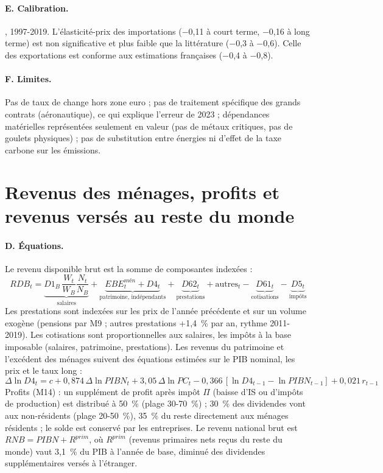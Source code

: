 \paragraph{E. Calibration.} , 1997-2019. L'élasticité-prix des importations ($-$0,11 à court terme, $-$0,16 à
long terme) est non significative et plus faible que la littérature ($-$0,3 à $-$0,6). Celle des exportations est
conforme aux estimations françaises ($-$0,4 à $-$0,8).

\paragraph{F. Limites.} Pas de taux de change hors zone euro ; pas de traitement spécifique des grands contrats
(aéronautique), ce qui explique l'erreur de 2023 ; dépendances matérielles représentées seulement en valeur (pas de
métaux critiques, pas de goulets physiques) ; pas de substitution entre énergies ni d'effet de la taxe carbone sur les
émissions.

\section{Revenus des ménages, profits et revenus versés au reste du monde}
\label{sec:revenus}

\paragraph{D. Équations.} Le revenu disponible brut est la somme de composantes indexées :
\begin{equation}
RDB_t = \underbrace{D1_B\,\frac{W_t}{W_B}\frac{N_t}{N_B}}_{\text{salaires}} + \underbrace{EBE^{mén}_t + D4_t}_{\text{patrimoine, indépendants}}
+ \underbrace{D62_t}_{\text{prestations}} + \text{autres}_t - \underbrace{D61_t}_{\text{cotisations}} - \underbrace{D5_t}_{\text{impôts}}
\end{equation}
Les prestations sont indexées sur les prix de l'année précédente et sur un volume exogène (pensions par M9 ; autres
prestations +1,4~\% par an, rythme 2011-2019). Les cotisations sont proportionnelles aux salaires, les impôts à la base
imposable (salaires, patrimoine, prestations). Les revenus du patrimoine et l'excédent des ménages suivent des équations
estimées sur le PIB nominal, les prix et le taux long :
\begin{equation}
\Delta\ln D4_t = c + 0{,}874\,\Delta\ln PIBN_t + 3{,}05\,\Delta\ln PC_t - 0{,}366\,[\ln D4_{t-1}-\ln PIBN_{t-1}] + 0{,}021\,r_{t-1}
\end{equation}
Profits (M14) : un supplément de profit après impôt $\Pi$ (baisse d'IS ou d'impôts de production) est distribué à
50~\% (plage 30-70~\%) ; 30~\% des dividendes vont aux non-résidents (plage 20-50~\%), 35~\% du reste directement aux
ménages résidents ; le solde est conservé par les entreprises. Le revenu national brut est $RNB = PIBN + R^{prim}$,
où $R^{prim}$ (revenus primaires nets reçus du reste du monde) vaut 3,1~\% du PIB à l'année de base, diminué des
dividendes supplémentaires versés à l'étranger.

